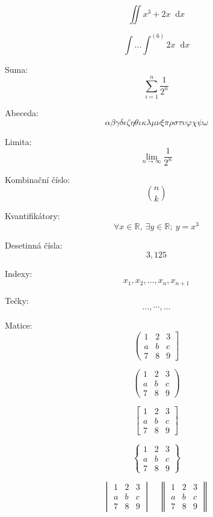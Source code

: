 \documentclass[a4paper, 12pt]{article}
\newcommand*\diff{\mathop{}\!\mathrm{d}}
\begin{document}
$$ \iint x^3 + 2x \diff{x} $$

$$ \int \dots \int^{(6)} 2x \diff{x} $$


Suma:
$$ \sum_{i=1}^{n}  \frac{1}{2^n} $$

Abeceda:
$$ \alpha \beta \gamma \delta \epsilon \zeta \eta \theta \iota \kappa \lambda \mu \nu \xi \pi \rho \sigma \tau \upsilon \varphi \chi \psi \omega  $$

Limita:
$$ \lim_{n \to \infty} \frac{1}{2^n} $$

Kombinační číslo:
$$ \binom{n}{k} $$

Kvantifikátory:
$$ \forall{x} \in \mathbb{R},\ \exists{y} \in \mathbb{R}; \ y = x ^ 3$$

Desetinná čísla:
$$ 3{,}125 $$

Indexy:
$$ x_1, x_2, \dots, x_n, x_{n+1} $$

Tečky:
$$ \dots, \cdots, \ldots $$

Matice:
$$
    \left(
    \begin{matrix}
        1 & 2 & 3 \\
        a & b & c \\
        7 & 8 & 9
    \end{matrix}
    \right]
$$

$$
    \begin{pmatrix}
        1 & 2 & 3 \\
        a & b & c \\
        7 & 8 & 9
    \end{pmatrix}
$$

$$
    \begin{bmatrix}
        1 & 2 & 3 \\
        a & b & c \\
        7 & 8 & 9
    \end{bmatrix}
$$

$$
    \begin{Bmatrix}
        1 & 2 & 3 \\
        a & b & c \\
        7 & 8 & 9
    \end{Bmatrix}
$$

$$
    \begin{vmatrix}
        1 & 2 & 3 \\
        a & b & c \\
        7 & 8 & 9
    \end{vmatrix}
    \quad %
    \begin{Vmatrix}
        1 & 2 & 3 \\
        a & b & c \\
        7 & 8 & 9
    \end{Vmatrix}
$$
\end{document}
